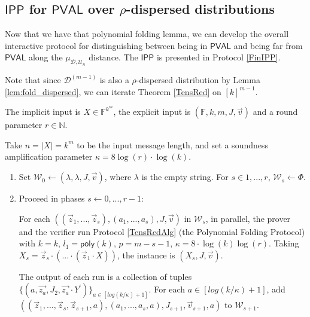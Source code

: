 \documentclass[10pt,a4paper]{article}
\makeatletter
\newcommand{\poly}{\mathsf{poly}}
\newcommand{\PVAL}{\mathsf{PVAL}}
\newcommand{\IPP}{\mathsf{IPP}}
\newcommand{\sD}{\mathcal{D}}
\newenvironment{protocol}[1][htb]{
    \renewcommand{\ALG@name}{Protocol}
    \begin{algorithm}[#1]
    }{\end{algorithm}
}
\makeatother
\begin{document}
\subsection{$\IPP$ for $\PVAL$ over $\rho$-dispersed distributions}
\label{sec:IPP}

Now that we have that polynomial folding lemma, we can develop the overall interactive protocol for distinguishing between being in $\PVAL$ and being far from $\PVAL$ along the $\mu_{\mathcal{D},\mathcal{U}_{n}}$ distance. The $\IPP$ is presented in Protocol \ref{FinIPP}.

Note that since $\sD^{(m-1)}$ is also a $\rho$-dispersed distribution by Lemma \ref{lem:fold_dispersed}, we can iterate Theorem \ref{TensRed} on $[k]^{m-1}$.

\begin{protocol}
\caption{$\IPP$ for $\PVAL$ over $\rho$-dispersed distributions}
\label{FinIPP}
The implicit input is $X \in \mathbb{F}^{k^{m}}$, the explicit input is $(\mathbb{F}, k, m, J, \vec{v})$ and a round parameter $r \in \mathbb{N}$.

Take $n = \vert X\vert  = k^{m}$ to be the input message length, and set a soundness amplification parameter $\kappa = 8 \log (r) \cdot \log (k)$.

\begin{enumerate}
    \item Set $\mathcal{W}_{0} \longleftarrow {(\lambda, \lambda, J, \vec{v})}$, where $\lambda$ is the empty string. For $s \in {1, . . . , r}$, $\mathcal{W}_{s}\longleftarrow \Phi$.
    \item\label{FinIPPPFSteps} Proceed in phases $s \longleftarrow 0, . . . , r - 1$:

    For each $((\vec{z}_{1}, . . . , \vec{z}_{s}),(a_{1}, . . . , a_{s}), J, \vec{v})$ in $\mathcal{W}_{s}$, in parallel, the prover and the verifier run Protocol \ref{TensRedAlg} (the Polynomial Folding Protocol) with $k =k$, $l_{1}=\poly(k)$, $p=m-s-1$, $\kappa=8\cdot \log (k) \log (r)$. Taking $X_{s} = \vec{z}_{s}\cdot (. . . \cdot(\vec{z}_{1} \cdot X))$, the instance is $(X_{s}, J, \vec{v})$.

    The output of each run is a collection of tuples $\{(a, \vec{z_{a}}, J_{2}, \vec{z_{a}}\cdot  Y^\prime)\}_{a\in[log(k/\kappa)+1]}$. For each $a\in[log(k/\kappa)+1]$, add $((\vec{z}_{1}, . . . , \vec{z}_{s}, \vec{z}_{s+1},a),(a_{1}, . . . , a_{s}, a), J_{s+1}, \vec{v}_{s+1},a)$ to $\mathcal{W}_{s+1}$.


\end{enumerate}
\end{protocol}
\end{document}
